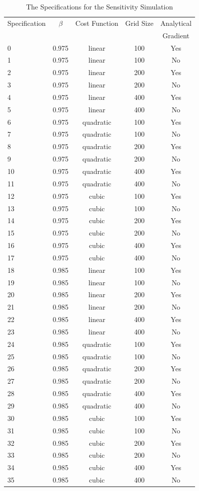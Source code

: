 \begin{table}[H]
	\centering
	\caption{The Specifications for the Sensitivity Simulation}
	\label{table3}
	\begin{tabular}{l c c c c}
		\toprule\midrule
		Specification & $\beta$ & Cost Function & Grid Size & Analytical \\
		& & & & Gradient \\ \midrule
		0 & 0.975 & linear& 100& Yes\\
		1&0.975& linear& 100& No\\
		2&0.975& linear& 200& Yes\\
		3&0.975& linear& 200& No\\
		4&0.975& linear& 400& Yes\\
		5&0.975& linear& 400& No\\
		6&0.975& quadratic& 100& Yes\\
		7&0.975& quadratic& 100& No\\
		8&0.975& quadratic& 200& Yes\\
		9&0.975& quadratic& 200& No\\
		10&0.975& quadratic& 400& Yes\\
		11&0.975& quadratic& 400& No\\
		12&0.975& cubic& 100& Yes\\
		13&0.975& cubic& 100& No\\
		14&0.975& cubic& 200& Yes\\
		15&0.975& cubic& 200& No\\
		16&0.975& cubic& 400& Yes\\
		17&0.975& cubic& 400& No\\
		18&0.985& linear& 100& Yes\\
		19&0.985& linear& 100& No\\
		20&0.985& linear& 200& Yes\\
		21&0.985& linear& 200& No\\
		22&0.985& linear& 400& Yes\\
		23&0.985& linear& 400& No\\
		24&0.985& quadratic& 100& Yes\\
		25&0.985& quadratic& 100& No\\
		26&0.985& quadratic& 200& Yes\\
		27&0.985& quadratic& 200& No\\
		28&0.985& quadratic& 400& Yes\\
		29&0.985& quadratic& 400& No\\
		30&0.985& cubic& 100& Yes\\
		31&0.985& cubic& 100& No\\
		32&0.985& cubic& 200& Yes\\
		33&0.985& cubic& 200& No\\
		34&0.985& cubic& 400& Yes\\
		35&0.985& cubic& 400& No\\
		\bottomrule
	\end{tabular}
\end{table}


